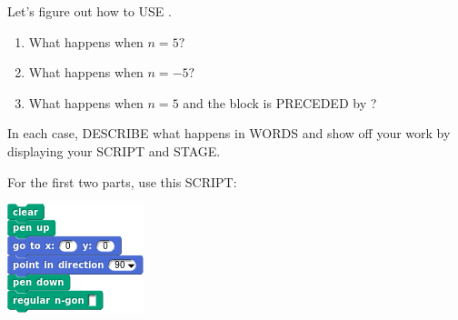 \documentclass[noauthor,nooutcomes,handout]{ximera}
\begin{document}
\begin{question}
  Let's figure out how to USE
  .
  \begin{enumerate}
  \item What happens when $n=5?$
  \item What happens when $n=-5?$
  \item What happens when $n=5$ and the block is PRECEDED by
    ?
  \end{enumerate}
  In each case, DESCRIBE what happens in WORDS and show off your work
  by displaying your SCRIPT and STAGE.
  \begin{hint}
    For the first two parts, use this SCRIPT:
    \begin{center}
      \includegraphics{nGonBlockClearBlank.png}
    \end{center}
  \end{hint}
  

\end{question}
\end{document}
